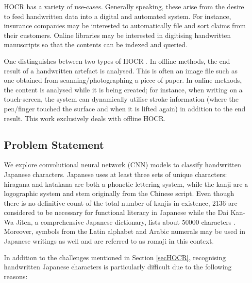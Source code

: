 \documentclass[british,12p]{article}
\begin{document}
    HOCR has a variety of use-cases. Generally speaking, these arise from the desire to feed handwritten data into a digital and automated system. For instance, insurance companies may be interested to automatically file and sort claims from their customers. Online libraries may be interested in digitising handwritten manuscripts so that the contents can be indexed and queried. 
    
    One distinguishes between two types of HOCR \cite{perwei:2014}. In offline methods, the end result of a handwritten artefact is analysed. This is often an image file such as one obtained from scanning/photographing a piece of paper. In online methods, the content is analysed while it is being created; for instance, when writing on a touch-screen, the system can dynamically utilise stroke information (where the pen/finger touched the surface and when it is lifted again) in addition to the end result. This work exclusively deals with offline HOCR. 
    
    \subsection{Problem Statement}
    We explore convolutional neural network (CNN) models to classify handwritten Japanese characters. Japanese uses at least three sets of unique characters: hiragana and katakana are both a phonetic lettering system, while the kanji are a logographic system and stem originally from the Chinese script. Even though there is no definitive count of the total number of kanjis in existence, 2136 are considered to be necessary for functional literacy in Japanese while the  Dai Kan-Wa Jiten, a comprehensive Japanese dictionary, lists about 50000 characters \cite{morohashi:90}. Moreover, symbols from the Latin alphabet and Arabic numerals may be used in Japanese writings as well and are referred to as romaji in this context. 
    
    In addition to the challenges mentioned in Section \ref{secHOCR}, recognising handwritten Japanese characters is particularly difficult due to the following reasons:
    
\end{document}
